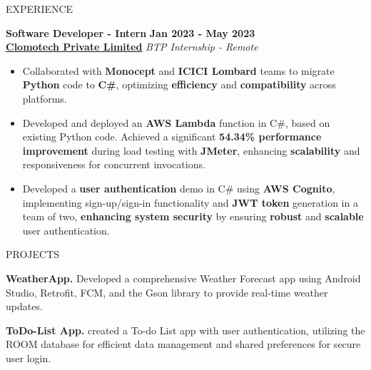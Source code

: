 \documentclass{resume} %
\begin{document}
\begin{rSection}{EXPERIENCE}
\begin{itemize}
 \end{itemize}

\textbf{Software Developer - Intern } \hfill \textbf{Jan 2023 - May 2023}\\ 
\textbf{\href{https://www.linkedin.com/company/Clomotech/}{Clomotech Private Limited}} \hfill \textit{BTP Internship - Remote}
 \begin{itemize}
    \itemsep -3pt {} 
    
     \item Collaborated with \textbf{Monocept} and \textbf{ICICI Lombard} teams to migrate \textbf{Python} code to \textbf{C\#}, optimizing \textbf{efficiency} and \textbf{compatibility} across platforms.
     \item Developed and deployed an \textbf{AWS Lambda} function in C\#, based on existing Python code. Achieved a significant \textbf{54.34\% performance improvement} during load testing with \textbf{JMeter}, enhancing \textbf{scalability} and responsiveness for concurrent invocations.
     \item Developed a \textbf{user authentication} demo in C\# using \textbf{AWS Cognito}, implementing sign-up/sign-in functionality and \textbf{JWT token} generation in a team of two, \textbf{enhancing system security} by ensuring \textbf{robust} and \textbf{scalable} user authentication.

 \end{itemize}
 

\end{rSection} 

\begin{rSection}{PROJECTS}
\vspace{-1.25em}
\item \textbf{WeatherApp.} {Developed a comprehensive Weather Forecast app using Android Studio, Retrofit, FCM, and the Gson library to provide real-time weather updates.}
\item \textbf{ToDo-List App.} {created a To-do List app with user authentication, utilizing the ROOM database for efficient data management and shared preferences for secure user login.}
\end{rSection} 
\end{document}
